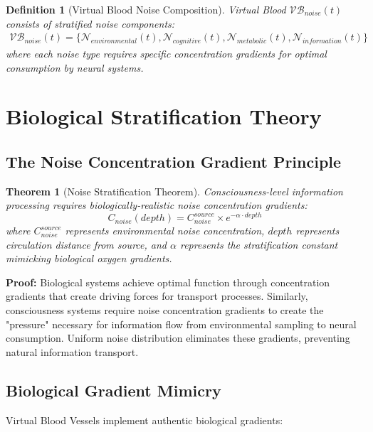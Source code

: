 \documentclass[12pt,a4paper]{article}
\newtheorem{theorem}{Theorem}
\newtheorem{definition}{Definition}
\begin{document}
\begin{definition}[Virtual Blood Noise Composition]
Virtual Blood $\mathcal{VB}_{noise}(t)$ consists of stratified noise components:
\begin{align}
\mathcal{VB}_{noise}(t) = \{\mathcal{N}_{environmental}(t), \mathcal{N}_{cognitive}(t), \mathcal{N}_{metabolic}(t), \mathcal{N}_{information}(t)\}
\end{align}
where each noise type requires specific concentration gradients for optimal consumption by neural systems.
\end{definition}

\section{Biological Stratification Theory}

\subsection{The Noise Concentration Gradient Principle}

\begin{theorem}[Noise Stratification Theorem]
Consciousness-level information processing requires biologically-realistic noise concentration gradients:
\begin{equation}
C_{noise}(depth) = C_{noise}^{source} \times e^{-\alpha \cdot depth}
\end{equation}
where $C_{noise}^{source}$ represents environmental noise concentration, $depth$ represents circulation distance from source, and $\alpha$ represents the stratification constant mimicking biological oxygen gradients.
\end{theorem}

\textbf{Proof:}
Biological systems achieve optimal function through concentration gradients that create driving forces for transport processes. Similarly, consciousness systems require noise concentration gradients to create the "pressure" necessary for information flow from environmental sampling to neural consumption. Uniform noise distribution eliminates these gradients, preventing natural information transport.

\subsection{Biological Gradient Mimicry}

Virtual Blood Vessels implement authentic biological gradients:
\end{document}
